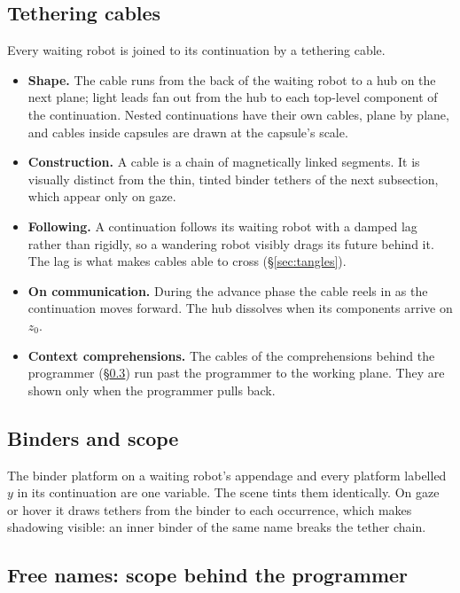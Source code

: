 \documentclass[11pt]{article}
\newcommand{\zlive}{z_0}
\begin{document}
\subsection{Tethering cables}\label{sec:cables}
Every waiting robot is joined to its continuation by a tethering cable.
\begin{itemize}
  \item \textbf{Shape.} The cable runs from the back of the waiting robot to a hub on the next
    plane; light leads fan out from the hub to each top-level component of the continuation.
    Nested continuations have their own cables, plane by plane, and cables inside capsules are
    drawn at the capsule's scale.
  \item \textbf{Construction.} A cable is a chain of magnetically linked segments. It is visually
    distinct from the thin, tinted binder tethers of the next subsection, which appear only on
    gaze.
  \item \textbf{Following.} A continuation follows its waiting robot with a damped lag rather than
    rigidly, so a wandering robot visibly drags its future behind it. The lag is what makes cables
    able to cross (\S\ref{sec:tangles}).
  \item \textbf{On communication.} During the advance phase the cable reels in as the continuation
    moves forward. The hub dissolves when its components arrive on $\zlive$.
  \item \textbf{Context comprehensions.} The cables of the comprehensions behind the programmer
    (\S\ref{sec:scope}) run past the programmer to the working plane. They are shown only when the
    programmer pulls back.
\end{itemize}

\subsection{Binders and scope}
The binder platform on a waiting robot's appendage and every platform labelled $y$ in its
continuation are one variable. The scene tints them identically. On gaze or hover it draws
tethers from the binder to each occurrence, which makes shadowing visible: an inner binder
of the same name breaks the tether chain.

\subsection{Free names: scope behind the programmer}\label{sec:scope}
\end{document}
